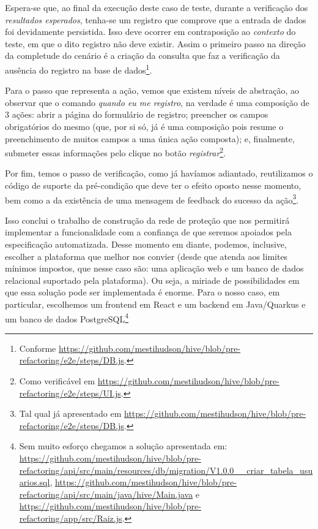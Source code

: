   Espera-se que, ao final da execução deste caso de teste, durante a verificação dos \emph{resultados esperados}, tenha-se um registro que comprove que a entrada de dados foi devidamente persistida. Isso deve ocorrer em contraposição ao \emph{contexto} do teste, em que o dito registro não deve existir. Assim o primeiro passo na direção da completude do cenário é a criação da consulta que faz a verificação da ausência do registro na base de dados\footnote{Conforme \url{https://github.com/mestihudson/hive/blob/pre-refactoring/e2e/steps/DB.js}.}.

  Para o passo que representa a ação, vemos que existem níveis de abstração, ao observar que o comando \emph{quando eu me registro}, na verdade é uma composição de 3 ações: abrir a página do formulário de registro; preencher os campos obrigatórios do mesmo (que, por si só, já é uma composição pois resume o preenchimento de muitos campos a uma única ação composta); e, finalmente, submeter essas informações pelo clique no botão \emph{registrar}\footnote{Como verificável em \url{https://github.com/mestihudson/hive/blob/pre-refactoring/e2e/steps/UI.js}.}.

  Por fim, temos o passo de verificação, como já havíamos adiantado, reutilizamos o código de suporte da pré-condição que deve ter o efeito oposto nesse momento, bem como a da existência de uma mensagem de feedback do sucesso da ação\footnote{Tal qual já apresentado em \url{https://github.com/mestihudson/hive/blob/pre-refactoring/e2e/steps/DB.js}.}.

  Isso conclui o trabalho de construção da rede de proteção que nos permitirá implementar a funcionalidade com a confiança de que seremos apoiados pela especificação automatizada. Desse momento em diante, podemos, inclusive, escolher a plataforma que melhor nos convier (desde que atenda aos limites mínimos impostos, que nesse caso são: uma aplicação web e um banco de dados relacional suportado pela plataforma). Ou seja, a miriade de possibilidades em que essa solução pode ser implementada é enorme. Para o nosso caso, em particular, escolhemos um frontend em React e um backend em Java/Quarkus e um banco de dados PostgreSQL\footnote{Sem muito esforço chegamos a solução apresentada em: \url{https://github.com/mestihudson/hive/blob/pre-refactoring/api/src/main/resources/db/migration/V1.0.0__criar_tabela_usuarios.sql}, \url{https://github.com/mestihudson/hive/blob/pre-refactoring/api/src/main/java/hive/Main.java} e \url{https://github.com/mestihudson/hive/blob/pre-refactoring/app/src/Raiz.js}.}


